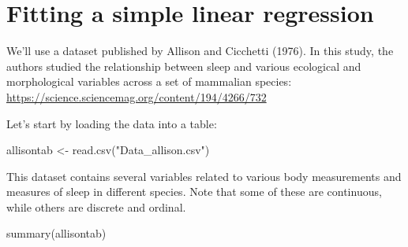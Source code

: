 \documentclass[
]{book}
\newenvironment{Shaded}{\begin{snugshade}}{\end{snugshade}}
\newcommand{\FunctionTok}[1]{\textcolor[rgb]{0.00,0.00,0.00}{#1}}
\newcommand{\NormalTok}[1]{#1}
\newcommand{\OtherTok}[1]{\textcolor[rgb]{0.56,0.35,0.01}{#1}}
\newcommand{\StringTok}[1]{\textcolor[rgb]{0.31,0.60,0.02}{#1}}
\begin{document}
\hypertarget{fitting-a-simple-linear-regression}{%
\section{Fitting a simple linear regression}\label{fitting-a-simple-linear-regression}}

We'll use a dataset published by Allison and Cicchetti (1976). In this study, the authors studied the relationship between sleep and various ecological and morphological variables across a set of mammalian species:
\url{https://science.sciencemag.org/content/194/4266/732}

Let's start by loading the data into a table:

\begin{Shaded}
\begin{Highlighting}[]
\NormalTok{allisontab }\OtherTok{\textless{}{-}} \FunctionTok{read.csv}\NormalTok{(}\StringTok{"Data\_allison.csv"}\NormalTok{)}
\end{Highlighting}
\end{Shaded}

This dataset contains several variables related to various body measurements and measures of sleep in different species. Note that some of these are continuous, while others are discrete and ordinal.

\begin{Shaded}
\begin{Highlighting}[]
\FunctionTok{summary}\NormalTok{(allisontab)}
\end{Highlighting}
\end{Shaded}
\end{document}
